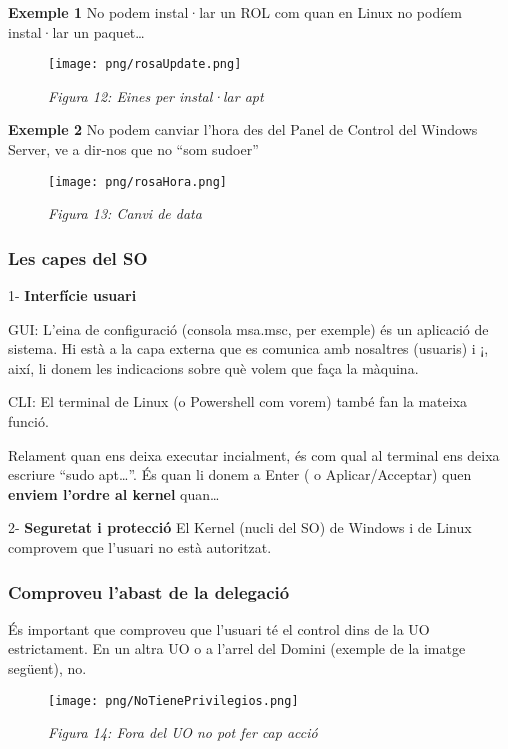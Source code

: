\documentclass[
  a4paper,
]{article}
\begin{document}
\textbf{Exemple 1} No podem instal·lar un ROL com quan en Linux no
podíem instal·lar un paquet\ldots{}

\begin{figure}
\centering
\texttt{[image: png/rosaUpdate.png]}
\caption{\emph{Figura 12: Eines per instal·lar apt}}
\end{figure}

\textbf{Exemple 2} No podem canviar l'hora des del Panel de Control del
Windows Server, ve a dir-nos que no ``som sudoer''

\begin{figure}
\centering
\texttt{[image: png/rosaHora.png]}
\caption{\emph{Figura 13: Canvi de data}}
\end{figure}

\subsubsection{Les capes del SO}\label{les-capes-del-so}

1- \textbf{Interfície usuari}

GUI: L'eina de configuració (consola msa.msc, per exemple) és un
aplicació de sistema. Hi està a la capa externa que es comunica amb
nosaltres (usuaris) i ¡, així, li donem les indicacions sobre què volem
que faça la màquina.

CLI: El terminal de Linux (o Powershell com vorem) també fan la mateixa
funció.

Relament quan ens deixa executar incialment, és com qual al terminal ens
deixa escriure ``sudo apt\ldots{}''. És quan li donem a Enter ( o
Aplicar/Acceptar) quen \textbf{enviem l'ordre al kernel} quan\ldots{}

2- \textbf{Seguretat i protecció} El Kernel (nucli del SO) de Windows i
de Linux comprovem que l'usuari no està autoritzat.

\subsubsection{Comproveu l'abast de la
delegació}\label{comproveu-labast-de-la-delegaciuxf3}

És important que comproveu que l'usuari té el control dins de la UO
estrictament. En un altra UO o a l'arrel del Domini (exemple de la
imatge següent), no.

\begin{figure}
\centering
\texttt{[image: png/NoTienePrivilegios.png]}
\caption{\emph{Figura 14: Fora del UO no pot fer cap acció}}
\end{figure}
\end{document}
